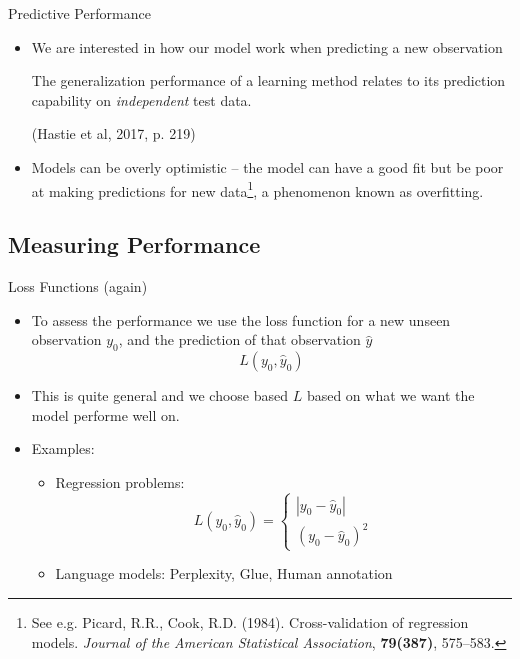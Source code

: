 \documentclass[10pt,handout]{beamer}
\begin{document}
\begin{frame}{Predictive Performance}


\begin{itemize}

\item We are interested in how our model work when predicting a new observation \\

\begin{displayquote}
The generalization performance of a learning method relates to its prediction capability on \emph{independent} test data.

(Hastie et al, 2017, p. 219)
\end{displayquote}

\pause

\item Models can be overly optimistic -- the model can have a good fit but be poor at making predictions for new data\footnote{See e.g. Picard, R.R., Cook, R.D. (1984). Cross-validation of regression models. \emph{Journal of the American Statistical Association}, \textbf{79(387)}, 575--583.}, a phenomenon known as {\color{uured}overfitting}.\\[3mm]

\end{itemize}

\end{frame}

\subsection{Measuring Performance}

\begin{frame}{Loss Functions (again)}



\begin{itemize}

\item To assess the performance we use the loss function for a new unseen observation $y_0$, and the prediction of that observation $\hat{y}$
\[
L(y_0,\hat{y}_0)
\]\pause
\item This is quite general and we choose based $L$ based on what we want the model performe well on.\pause
\item Examples:
\begin{itemize}
\item Regression problems:
\[
    L(y_0,\hat{y}_0) =
\begin{cases}
    |y_0 - \hat{y}_0|\\
    (y_0 - \hat{y}_0)^2
\end{cases}
\]\pause
\item Language models: Perplexity, Glue, Human annotation
\end{itemize}


\end{itemize}

\end{frame}
\end{document}
